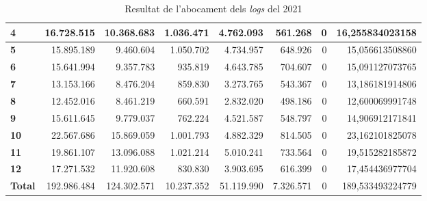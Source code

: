 \begin{table}[h!]
\begin{adjustbox}{width=1.5\textwidth, center}
\begin{tabular}{|l|r|r|r|r|r|r|r|}
            \textbf{4}     & 16.728.515  & 10.368.683  & 1.036.471  & 4.762.093  & 561.268   & 0 & 16,255834023158  \\
            \midrule
            \textbf{5}     & 15.895.189  & 9.460.604   & 1.050.702  & 4.734.957  & 648.926   & 0 & 15,056613508860  \\
            \textbf{6}     & 15.641.994  & 9.357.783   & 935.819    & 4.643.785  & 704.607   & 0 & 15,091127073765  \\
            \textbf{7}     & 13.153.166  & 8.476.204   & 859.830    & 3.273.765  & 543.367   & 0 & 13,186181914806  \\
            \textbf{8}     & 12.452.016  & 8.461.219   & 660.591    & 2.832.020  & 498.186   & 0 & 12,600069991748  \\
            \midrule
            \textbf{9}     & 15.611.645  & 9.779.037   & 762.224    & 4.521.587  & 548.797   & 0 & 14,906912171841  \\
            \textbf{10}    & 22.567.686  & 15.869.059  & 1.001.793  & 4.882.329  & 814.505   & 0 & 23,162101825078  \\
            \textbf{11}    & 19.861.107  & 13.096.088  & 1.021.214  & 5.010.241  & 733.564   & 0 & 19,515282185872  \\
            \textbf{12}    & 17.271.532  & 11.920.608  & 830.830    & 3.903.695  & 616.399   & 0 & 17,454436977704  \\
            \midrule
            \textbf{Total} & 192.986.484 & 124.302.571 & 10.237.352 & 51.119.990 & 7.326.571 & 0 & 189,533493224779 \\
            \bottomrule
        \end{tabular}
    \end{adjustbox}
    \caption{Resultat de l'abocament dels \textit{logs} del 2021}
    \label{tab:logs-table-2021}
\end{table}
